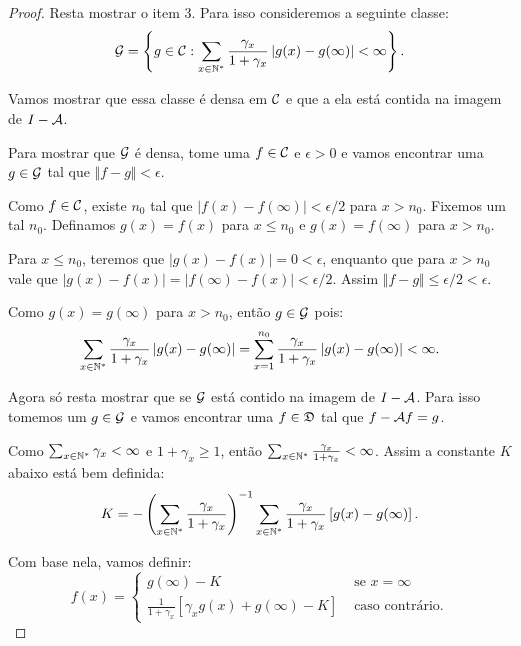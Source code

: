 \begin{proof}
  Resta mostrar o item 3. Para isso consideremos a seguinte classe:
  \begin{equation}
    \label{eq:imagem-gerador}
    {\mathcal{G}} = \left\{ g \in {\mathcal{C}}: \sum_{x \in {\mathbb{N^*}}} \frac{\gamma_x}{1 +
        \gamma_x} \left| g(x) - g(\infty) \right| < \infty \right\}.
  \end{equation}

  Vamos mostrar que essa classe é densa em ${\mathcal{C}}$ e que a ela está
  contida na imagem de $I - {\mathcal{A}}$.

  Para mostrar que ${\mathcal{G}}$ é densa, tome uma $f \in {\mathcal{C}}$ e $\epsilon >
  0$ e vamos encontrar uma $g \in {\mathcal{G}}$ tal que $\Vert f - g \Vert <
  \epsilon$.

  Como $f \in {\mathcal{C}}$, existe $n_0$ tal que $|f(x) - f(\infty)| <
  \epsilon/2$ para $x > n_0$. Fixemos um tal $n_0$. Definamos $g(x) = f(x)$
  para $x \leq n_0$ e $g(x) = f(\infty)$ para $x > n_0$.

  Para $x \leq n_0$, teremos que $|g(x) - f(x)| = 0 < \epsilon$,
  enquanto que para $x > n_0$ vale que $|g(x) - f(x)| = |f(\infty) -
  f(x)| < \epsilon/2$. Assim $\Vert f - g \Vert \leq \epsilon/2 <
  \epsilon$.

  Como $g(x) = g(\infty)$ para $x > n_0$, então $g \in {\mathcal{G}}$ pois:
  \begin{displaymath}
    \sum_{x \in {\mathbb{N^*}}} \frac{\gamma_x}{1 +
        \gamma_x} \left| g(x) - g(\infty) \right|
      =
      \sum_{x = 1}^{n_0} \frac{\gamma_x}{1 +
        \gamma_x} \left| g(x) - g(\infty) \right| <  \infty.
  \end{displaymath}

  Agora só resta mostrar que se ${\mathcal{G}}$ está contido na imagem de $I -
  {\mathcal{A}}$. Para isso tomemos um $g \in {\mathcal{G}}$ e vamos encontrar uma $f \in
  {\mathfrak{D}}$ tal que $f - {\mathcal{A}} f = g$.

  Como $\sum_{x \in {\mathbb{N^*}}} \gamma_x < \infty$ e $1 + \gamma_x \geq 1$,
  então $\sum_{x \in {\mathbb{N^*}}} \frac{\gamma_x}{1+\gamma_x} < \infty$. Assim
  a constante $K$ abaixo está bem definida:
  \begin{displaymath}
    K = -\left( \sum_{x \in {\mathbb{N^*}}} \frac{\gamma_x}{1+\gamma_x} \right)^{-1}
    \sum_{x \in {\mathbb{N^*}}} \frac{\gamma_x}{1 +
      \gamma_x} \left[ g(x) - g(\infty) \right].
  \end{displaymath}

  Com base nela, vamos definir:
  \begin{equation}
    \label{eq:inversa-imagem}
    f(x) = \begin{cases}
      g(\infty) - K & \textrm{ se } x = \infty\\
      \frac{1}{1+\gamma_x} \left[
        \gamma_x g(x) + g(\infty) - K
      \right] & \textrm{ caso contrário.}
    \end{cases}
  \end{equation}


\end{proof}
